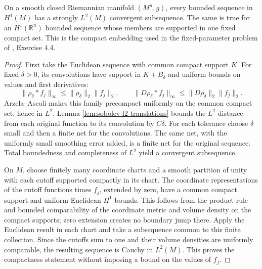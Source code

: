\begin{theorem}\label{thm:sobolev-closed-l2-compactness}
On a smooth closed Riemannian manifold $(M^n,g)$, every bounded sequence in $H^1(M)$ has a strongly $L^2(M)$ convergent subsequence. The same is true for an $H^1(\mathbb R^n)$ bounded sequence whose members are supported in one fixed compact set. This is the compact embedding used in the fixed-parameter problem of \cite{ChAC}, Exercise 4.4.
\end{theorem}
\begin{proof}
First take the Euclidean sequence with common compact support $K$. For fixed $\delta>0$, its convolutions have support in $K+\overline B_\delta$ and uniform bounds on values and first derivatives:
\[
 \|\rho_\delta*f_j\|_\infty\leq\|\rho_\delta\|_2\|f_j\|_2,
 \qquad
 \|D\rho_\delta*f_j\|_\infty\leq\|D\rho_\delta\|_2\|f_j\|_2.
\]
Arzela--Ascoli makes this family precompact uniformly on the common compact set, hence in $L^2$. Lemma \ref{lem:sobolev-l2-translations} bounds the $L^2$ distance from each original function to its convolution by $C\delta$. For each tolerance choose $\delta$ small and then a finite net for the convolutions. The same net, with the uniformly small smoothing error added, is a finite net for the original sequence. Total boundedness and completeness of $L^2$ yield a convergent subsequence.

On $M$, choose finitely many coordinate charts and a smooth partition of unity with each cutoff supported compactly in its chart. The coordinate representations of the cutoff functions times $f_j$, extended by zero, have a common compact support and uniform Euclidean $H^1$ bounds. This follows from the product rule and bounded comparability of the coordinate metric and volume density on the compact supports; zero extension creates no boundary jump there. Apply the Euclidean result in each chart and take a subsequence common to this finite collection. Since the cutoffs sum to one and their volume densities are uniformly comparable, the resulting sequence is Cauchy in $L^2(M)$. This proves the compactness statement without imposing a bound on the values of $f_j$.
\end{proof}

